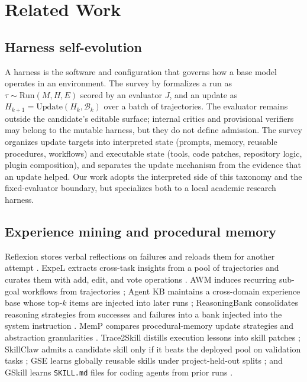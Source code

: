 \section{Related Work}
\label{sec:related}

\subsection{Harness self-evolution}
A harness is the software and configuration that governs how a base model operates in an environment. The survey by \citet{wei2026harnessrsi} formalizes a run as $\tau \sim \mathrm{Run}(M,H,E)$ scored by an evaluator $J$, and an update as $H_{k+1}=\mathrm{Update}(H_k,\mathcal{B}_k)$ over a batch of trajectories. The evaluator remains outside the candidate's editable surface; internal critics and provisional verifiers may belong to the mutable harness, but they do not define admission. The survey organizes update targets into interpreted state (prompts, memory, reusable procedures, workflows) and executable state (tools, code patches, repository logic, plugin composition), and separates the update mechanism from the evidence that an update helped. Our work adopts the interpreted side of this taxonomy and the fixed-evaluator boundary, but specializes both to a local academic research harness.

\subsection{Experience mining and procedural memory}
Reflexion stores verbal reflections on failures and reloads them for another attempt \citep{shinn2023reflexion}. ExpeL extracts cross-task insights from a pool of trajectories and curates them with add, edit, and vote operations \citep{zhao2024expel}. AWM induces recurring sub-goal workflows from trajectories \citep{wang2025workflow}; Agent KB maintains a cross-domain experience base whose top-$k$ items are injected into later runs \citep{tang2025agentkb}; ReasoningBank consolidates reasoning strategies from successes and failures into a bank injected into the system instruction \citep{ouyang2026reasoningbank}. MemP compares procedural-memory update strategies and abstraction granularities \citep{fang2026memp}. Trace2Skill distills execution lessons into skill patches \citep{ni2026trace2skill}; SkillClaw admits a candidate skill only if it beats the deployed pool on validation tasks \citep{ma2026skillclaw}; GSE learns globally reusable skills under project-held-out splits \citep{yang2026gse}; and GSkill learns \texttt{SKILL.md} files for coding agents from prior runs \citep{tan2026gskill}.

